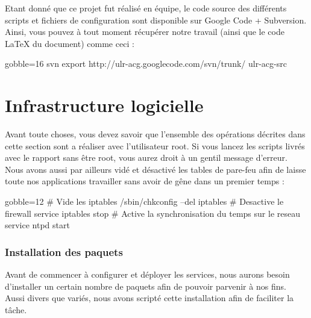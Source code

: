 \documentclass[11pt,a4paper]{report}
\begin{document}
            
            Etant donn\'e que ce projet fut r\'ealis\'e en \'equipe, le code source des diff\'erents scripts et fichiers de configuration sont disponible sur Google Code + Subversion. Ainsi, vous pouvez \`a tout moment r\'ecup\'erer notre travail (ainsi que le code {\LaTeX} du document) comme ceci :\\
            
            \begin{bashcode*}{gobble=16}
                svn export http://ulr-acg.googlecode.com/svn/trunk/ ulr-acg-src
            \end{bashcode*}
            
    \part{Infrastructure logicielle}
        
        Avant toute choses, vous devez savoir que l'ensemble des op\'erations d\'ecrites dans cette section sont a r\'ealiser avec l'utilisateur root. Si vous lancez les scripts livr\'es avec le rapport sans \^etre root, vous aurez droit \`a un gentil message d'erreur.\\
        
        Nous avons aussi par ailleurs vid\'e et d\'esactiv\'e les tables de pare-feu afin de laisse toute nos applications travailler sans avoir de g\^ene dans un premier temps :\\
        
        \begin{bashcode*}{gobble=12}
            # Vide les iptables
            /sbin/chkconfig --del iptables
            # Desactive le firewall
            service iptables stop
            # Active la synchronisation du temps sur le reseau
            service ntpd start
        \end{bashcode*}
        
        \section{Installation des paquets}
            
            Avant de commencer \`a configurer et d\'eployer les services, nous aurons besoin d'installer un certain nombre de paquets afin de pouvoir parvenir \`a nos fins. Aussi divers que vari\'es, nous avons script\'e cette installation afin de faciliter la t\^ache.\\
            
\end{document}
